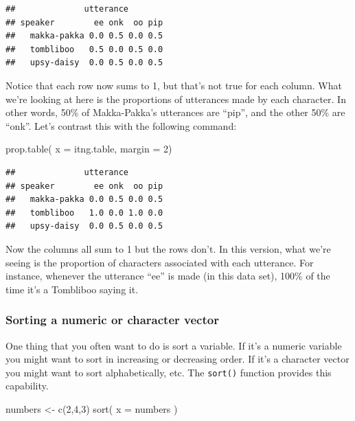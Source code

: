 \documentclass[
]{book}
\newenvironment{Shaded}{\begin{snugshade}}{\end{snugshade}}
\newcommand{\AttributeTok}[1]{\textcolor[rgb]{0.77,0.63,0.00}{#1}}
\newcommand{\DecValTok}[1]{\textcolor[rgb]{0.00,0.00,0.81}{#1}}
\newcommand{\FunctionTok}[1]{\textcolor[rgb]{0.00,0.00,0.00}{#1}}
\newcommand{\NormalTok}[1]{#1}
\newcommand{\OtherTok}[1]{\textcolor[rgb]{0.56,0.35,0.01}{#1}}
\begin{document}
\begin{verbatim}
##              utterance
## speaker        ee onk  oo pip
##   makka-pakka 0.0 0.5 0.0 0.5
##   tombliboo   0.5 0.0 0.5 0.0
##   upsy-daisy  0.0 0.5 0.0 0.5
\end{verbatim}

Notice that each row now sums to 1, but that's not true for each column. What we're looking at here is the proportions of utterances made by each character. In other words, 50\% of Makka-Pakka's utterances are ``pip'', and the other 50\% are ``onk''. Let's contrast this with the following command:

\begin{Shaded}
\begin{Highlighting}[]
\FunctionTok{prop.table}\NormalTok{( }\AttributeTok{x =}\NormalTok{ itng.table, }\AttributeTok{margin =} \DecValTok{2}\NormalTok{)}
\end{Highlighting}
\end{Shaded}

\begin{verbatim}
##              utterance
## speaker        ee onk  oo pip
##   makka-pakka 0.0 0.5 0.0 0.5
##   tombliboo   1.0 0.0 1.0 0.0
##   upsy-daisy  0.0 0.5 0.0 0.5
\end{verbatim}

Now the columns all sum to 1 but the rows don't. In this version, what we're seeing is the proportion of characters associated with each utterance. For instance, whenever the utterance ``ee'' is made (in this data set), 100\% of the time it's a Tombliboo saying it.

\hypertarget{sorting-a-numeric-or-character-vector}{%
\subsubsection{Sorting a numeric or character vector}\label{sorting-a-numeric-or-character-vector}}

One thing that you often want to do is sort a variable. If it's a numeric variable you might want to sort in increasing or decreasing order. If it's a character vector you might want to sort alphabetically, etc. The \texttt{sort()} function provides this capability.

\begin{Shaded}
\begin{Highlighting}[]
\NormalTok{numbers }\OtherTok{\textless{}{-}} \FunctionTok{c}\NormalTok{(}\DecValTok{2}\NormalTok{,}\DecValTok{4}\NormalTok{,}\DecValTok{3}\NormalTok{)}
\FunctionTok{sort}\NormalTok{( }\AttributeTok{x =}\NormalTok{ numbers )}
\end{Highlighting}
\end{Shaded}
\end{document}
